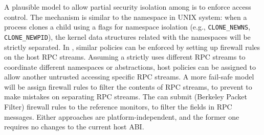 
A plausible model to allow partial security isolation among \picoprocs{}
is to enforce  access control.
The mechanism is similar to the namespace in UNIX system:
when a process clones a child using a flags for namespace isolation
(e.g., {\tt CLONE\_NEWNS}, {\tt CLONE\_NEWPID}),
the kernel data structures related with the namespaces will be strictly separated.
In \graphene{}, similar policies can be enforced
by setting up firewall rules on the host RPC streams.
Assuming a \picoproc{} strictly uses different RPC streams to coordinate different namespaces or abstractions,
host policies can be assigned to allow another untrusted
\picoproc{} accessing specific RPC streams.
A more fail-safe model will be assign firewall rules to filter the contents of RPC streams,
to prevent \picoprocs{} to make mistakes on separating RPC streams.
The \picoprocs{} can submit  (Berkeley Packet Filter) firewall rules to the reference monitors, to filter the fields in RPC messages.
Either approaches are platform-independent, and the former one requires no changes to the current host ABI.


